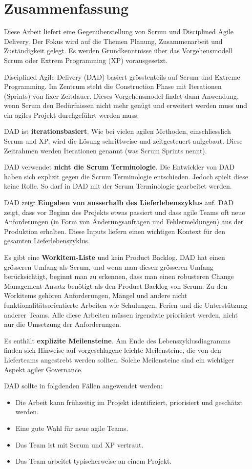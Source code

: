 \chapter*{Zusammenfassung}
\thispagestyle{fancy}

Diese Arbeit liefert eine Gegenüberstellung von Scrum und Disciplined Agile Delivery. Der Fokus wird auf die Themen Planung, Zusammenarbeit und Zuständigkeit gelegt. Es werden Grundkenntnisse über das Vorgehensmodell Scrum oder Extrem Programming (XP) vorausgesetzt.

Disciplined Agile Delivery (DAD) basiert grösstenteils auf Scrum und Extreme Programming. Im Zentrum steht die Construction Phase mit Iterationen (Sprints) von fixer Zeitdauer. Dieses Vorgehensmodel findet dann Anwendung, wenn Scrum den Bedürfnissen nicht mehr genügt und erweitert werden muss und ein agiles Projekt durchgeführt werden muss.

DAD ist \textbf{iterationsbasiert}. Wie bei vielen agilen Methoden, einschliesslich Scrum und XP, wird die Lösung schrittweise und zeitgesteuert aufgebaut. Diese Zeitrahmen werden Iterationen genannt (was Scrum Sprints nennt).

DAD verwendet \textbf{nicht die Scrum Terminologie}. Die Entwickler von DAD haben sich explizit gegen die Scrum Terminologie entschieden. Jedoch spielt diese keine Rolle. So darf in DAD mit der Scrum Terminologie gearbeitet werden.

DAD zeigt \textbf{Eingaben von ausserhalb des Lieferlebenszyklus} auf. DAD zeigt, dass vor Beginn des Projekts etwas passiert und dass agile Teams oft neue Anforderungen (in Form von Änderungsanfragen und Fehlermeldungen) aus der Produktion erhalten. Diese Inputs liefern einen wichtigen Kontext für den gesamten Lieferlebenszyklus.

Es gibt eine \textbf{Workitem-Liste} und kein Product Backlog. DAD hat einen grösseren Umfang als Scrum, und wenn man diesen grösseren Umfang berücksichtigt, beginnt man zu erkennen, dass man einen robusteren Change Management-Ansatz benötigt als den Product Backlog von Scrum. Zu den Workitems gehören Anforderungen, Mängel und andere nicht funktionalitätsorientierte Arbeiten wie Schulungen, Ferien und die Unterstützung anderer Teams. Alle diese Arbeiten müssen irgendwie priorisiert werden, nicht nur die Umsetzung der Anforderungen.

Es enthält \textbf{explizite Meilensteine}. Am Ende des Lebenszyklusdiagramms finden sich Hinweise auf vorgeschlagene leichte Meilensteine, die von den Lieferteams angestrebt werden sollten. Solche Meilensteine sind ein wichtiger Aspekt agiler Governance.

\pagebreak
DAD sollte in folgdenden Fällen angewendet werden:

\begin{itemize}
	\item Die Arbeit kann frühzeitig im Projekt identifiziert, priorisiert und geschätzt werden.
	\item Eine gute Wahl für neue agile Teams.
	\item Das Team ist mit Scrum und XP vertraut.
	\item Das Team arbeitet typischerweise an einem Projekt.
\end{itemize}

